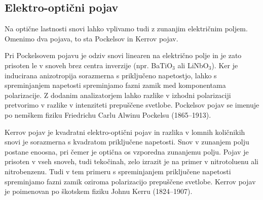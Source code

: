 \subsection*{Elektro-optični pojav}
Na optične lastnosti snovi lahko vplivamo tudi z zunanjim električnim poljem. Omenimo 
dva pojava, to sta Pockelsov in Kerrov pojav. 

Pri Pockelsovem
pojavu je odziv snovi linearen na električno polje in je zato prisoten le v snoveh
brez centra inverzije (npr. BaTiO$_3$ ali LiNbO$_3$). Ker je inducirana anizotropija sorazmerna
s priključeno napetostjo, lahko s spreminjanjem napetosti spreminjamo fazni zamik med 
komponentama polarizacije. Z dodanim analizatorjem lahko razlike v izhodni polarizaciji
pretvorimo v razlike v intenziteti prepuščene svetlobe. Pockelsov pojav se imenuje po
nemškem fiziku Friedrichu Carlu Alwinu Pockelsu (1865--1913).

Kerrov pojav je kvadratni elektro-optični pojav in razlika v lomnih količnikih snovi 
je sorazmerna s kvadratom priključene napetosti. Snov v zunanjem polju postane
enoosna, pri čemer je optična os vzporedna zunanjemu polju. Pojav je prisoten v vseh snoveh, tudi
tekočinah, zelo izrazit je na primer v nitrotoluenu ali nitrobenzenu. Tudi v tem 
primeru s spreminjanjem priključene napetosti spreminjamo fazni zamik oziroma polarizacijo
prepuščene svetlobe. Kerrov pojav je poimenovan po škotskem fiziku Johnu Kerru (1824--1907).
